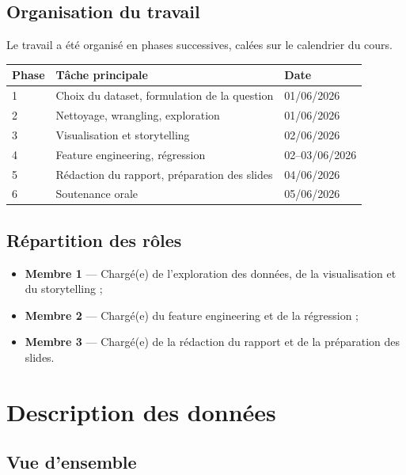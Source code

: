 \documentclass[12pt,a4paper]{article}
\begin{document}
\subsection{Organisation du travail}

Le travail a été organisé en phases successives, calées sur le calendrier du cours.

\begin{center}
\begin{tabular}{@{}lll@{}}
\toprule
\rowcolor{coffeecream}
\textbf{Phase} & \textbf{Tâche principale} & \textbf{Date} \\
\midrule
1 & Choix du dataset, formulation de la question & 01/06/2026 \\
2 & Nettoyage, wrangling, exploration & 01/06/2026 \\
3 & Visualisation et storytelling & 02/06/2026 \\
4 & Feature engineering, régression & 02--03/06/2026 \\
5 & Rédaction du rapport, préparation des slides & 04/06/2026 \\
6 & Soutenance orale & 05/06/2026 \\
\bottomrule
\end{tabular}
\end{center}

\subsection{Répartition des rôles}

\begin{itemize}[noitemsep]
  \item \textbf{Membre 1} — Chargé(e) de l'exploration des données, de la visualisation et
        du storytelling ;
  \item \textbf{Membre 2} — Chargé(e) du feature engineering et de la régression ;
  \item \textbf{Membre 3} — Chargé(e) de la rédaction du rapport et de la préparation des slides.
\end{itemize}

\section{Description des données}

\subsection{Vue d'ensemble}
\end{document}
